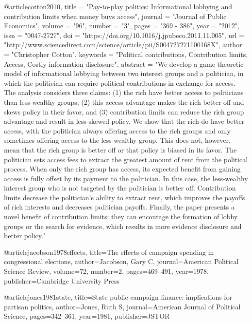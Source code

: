 @article{cotton2010,
title = "Pay-to-play politics: Informational lobbying and contribution limits when money buys access",
journal = "Journal of Public Economics",
volume = "96",
number = "3",
pages = "369 - 386",
year = "2012",
issn = "0047-2727",
doi = "https://doi.org/10.1016/j.jpubeco.2011.11.005",
url = "http://www.sciencedirect.com/science/article/pii/S004727271100168X",
author = "Christopher Cotton",
keywords = "Political contributions, Contribution limits, Access, Costly information disclosure",
abstract = "We develop a game theoretic model of informational lobbying between two interest groups and a politician, in which the politician can require political contributions in exchange for access. The analysis considers three claims: (1) the rich have better access to politicians than less-wealthy groups, (2) this access advantage makes the rich better off and skews policy in their favor, and (3) contribution limits can reduce the rich group advantage and result in less-skewed policy. We show that the rich do have better access, with the politician always offering access to the rich groups and only sometimes offering access to the less-wealthy group. This does not, however, mean that the rich group is better off or that policy is biased in its favor. The politician sets access fees to extract the greatest amount of rent from the political process. When only the rich group has access, its expected benefit from gaining access is fully offset by its payment to the politician. In this case, the less-wealthy interest group who is not targeted by the politician is better off. Contribution limits decrease the politician's ability to extract rent, which improves the payoffs of rich interests and decreases politician payoffs. Finally, the paper presents a novel benefit of contribution limits: they can encourage the formation of lobby groups or the search for evidence, which results in more evidence disclosure and better policy."
}

@article{jacobson1978effects,
  title={The effects of campaign spending in congressional elections},
  author={Jacobson, Gary C},
  journal={American Political Science Review},
  volume={72},
  number={2},
  pages={469--491},
  year={1978},
  publisher={Cambridge University Press}
}

@article{jones1981state,
  title={State public campaign finance: implications for partisan politics},
  author={Jones, Ruth S},
  journal={American Journal of Political Science},
  pages={342--361},
  year={1981},
  publisher={JSTOR}
}

